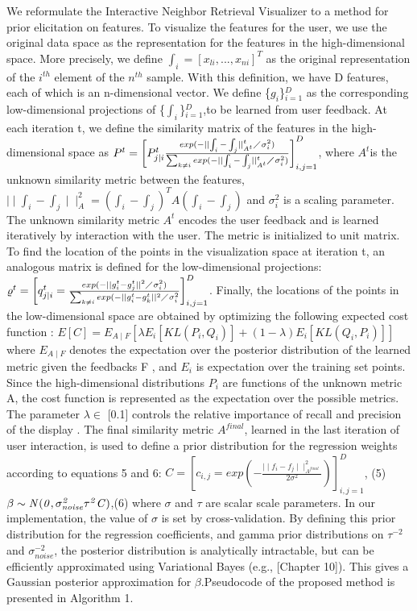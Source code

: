 \documentclass{sig-alternate}
\begin{document}
We reformulate the Interactive Neighbor Retrieval Visualizer \cite{PE.EuroVisShort.EuroVisShort2013.049-053} to
a method for prior elicitation on features. To visualize the features 
for the user, we use the original data space as the representation
for the features in the high-dimensional space. More precisely, we
define $\int_i=[x_{li}, ... ,x_{ni}]^T$ as the original representation
of the $i^{th}$ element of the
$n^{th}$ sample. With this definition, we have D features, each of which
is an n-dimensional
vector. We define \{$g_i$\}$^D_{i=1}$ as the corresponding low-dimensional
projections of \{$\int_i$\}$^D_{i=1}$,to be learned from user feedback.
At each iteration t, we define the similarity matrix of the features
in the high-dimensional space as 
$P^t=\left[P^t_{j\mid i}\frac{exp(-\mid \mid \int_{i}-\int_{j}\mid \mid_{A^t}^{t} \diagup\sigma^2_i)       }{\sum_{k\neq i }exp(-\mid \mid \int_{i}-\int_{j}\mid \mid_{A^t}^{t} \diagup\sigma^2_i)  }\right]^D_{i,j=1}$,
where $A^t$is the unknown similarity metric between the features,
$\mid\mid\int_{i} -\int_{j}\mid \mid^2_A=(\int_{i} -\int_{j})^TA(\int_{i} -\int_{j}) $
and 
$\sigma^2_i$
is a scaling parameter.
The unknown similarity metric
$A^t$
encodes the user feedback and
is learned iteratively by interaction with the user. The metric is
initialized to unit matrix.
To find the location of the points in the visualization space at
iteration t, an analogous matrix is defined for the low-dimensional
projections:
$\varrho^t=\left[q^t_{j\mid i}=\frac{exp(-\mid\mid g^t_i - g^t_j\mid\mid ^2\diagup\sigma^2_i)}{\sum_{k\neq i} exp(-\mid\mid g^t_i - g^t_k\mid\mid ^2\diagup\sigma^2_i} \right]^D_{i,j=1}$.
Finally, the locations of the points in the low-dimensional space are
obtained by optimizing the following expected cost function \cite{PE.EuroVisShort.EuroVisShort2013.049-053}:
$E[C]=E_{A\mid F}[\lambda E_i [KL(P_i,Q_i)]+(1-\lambda )E_i [KL(Q_i,P_i)]]$
where $E_{A\mid F}$ denotes the expectation over the posterior distribution
of the learned metric given the feedbacks F , and $E_i$ is expectation
over the training set points. Since the high-dimensional distributions $P_i$ 
are functions of the unknown metric A, the cost function
is represented as the expectation over the possible metrics. The
parameter $\lambda \in $ [0.1] controls the relative importance of recall and
precision of the display \cite{Venna:2010:IRP:1756006.1756019}. The final similarity metric $A^{final}$,
learned in the last iteration of user interaction, is used to define a
prior distribution for the regression weights according to equations
5 and 6:
$C=\left[c_{i,j}=exp(-\frac{\mid\mid f_i-f_j\mid\mid^2_{A^{final}}}{2\sigma^2}) \right]^D_{i,j=1}$, \hfill{(5)}
$\beta\sim\it{N}(0,\sigma^2_{noise}\tau^2C)$,\hfill{(6)}
where $\sigma$ and $\tau$ are scalar scale parameters. In our implementation,
the value of $\sigma$ is set by cross-validation.
By defining this prior distribution for the regression coefficients,
and gamma prior distributions on $\tau^{-2}$ and $\sigma^{-2}_{noise}$,
 the posterior distribution is analytically intractable, but can be efficiently approximated
using Variational Bayes (e.g., \cite{Bishop:2006:PRM:1162264}[Chapter 10]). This
gives a Gaussian posterior approximation for $\beta$.Pseudocode of the
proposed method is presented in Algorithm 1.
\\
\end{document}
